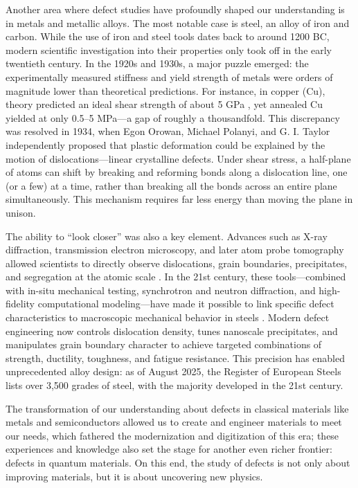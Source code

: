 Another area where defect studies have profoundly shaped our understanding is in metals and metallic alloys. The most notable case is steel, an alloy of iron and carbon. While the use of iron and steel tools dates back to around 1200 BC, modern scientific investigation into their properties only took off in the early twentieth century. In the 1920s and 1930s, a major puzzle emerged: the experimentally measured stiffness and yield strength of metals were orders of magnitude lower than theoretical predictions. For instance, in copper (Cu), theory predicted an ideal shear strength of about 5 GPa \cite{frenkelZurTheorieElastizitaetsgrenze1926}, yet annealed Cu yielded at only 0.5–5 MPa—a gap of roughly a thousandfold. This discrepancy was resolved in 1934, when Egon Orowan, Michael Polanyi, and G. I. Taylor independently proposed that plastic deformation could be explained by the motion of dislocations—linear crystalline defects. Under shear stress, a half-plane of atoms can shift by breaking and reforming bonds along a dislocation line, one (or a few) at a time, rather than breaking all the bonds across an entire plane simultaneously. This mechanism requires far less energy than moving the plane in unison.

The ability to “look closer” was also a key element. Advances such as X-ray diffraction, transmission electron microscopy, and later atom probe tomography allowed scientists to directly observe dislocations, grain boundaries, precipitates, and segregation at the atomic scale \cite{50YearsTEM,guoSegregationdislocationSelforganizedStructures2025,AtomProbeTomography}. In the 21st century, these tools—combined with in-situ mechanical testing, synchrotron and neutron diffraction, and high-fidelity computational modeling—have made it possible to link specific defect characteristics to macroscopic mechanical behavior in steels \cite{liReviewRecentProgress2022,kimSituNeutronDiffraction2020,gadalinskaDirectDeterminationPhase2021}. Modern defect engineering now controls dislocation density, tunes nanoscale precipitates, and manipulates grain boundary character to achieve targeted combinations of strength, ductility, toughness, and fatigue resistance. This precision has enabled unprecedented alloy design: as of August 2025, the Register of European Steels lists over 3,500 grades of steel, with the majority developed in the 21st century.

The transformation of our understanding about defects in classical materials like metals and semiconductors allowed us to create and engineer materials to meet our needs, which fathered the modernization and digitization of this era; these experiences and knowledge also set the stage for another even richer frontier: defects in quantum materials. On this end, the study of defects is not only about improving materials, but it is about uncovering new physics. 

